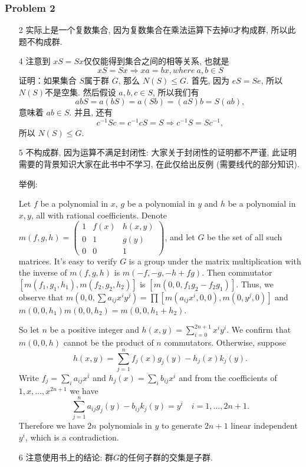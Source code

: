 \documentclass[a4paper,12pt]{ctexart}
\begin{document}
      

\subsubsection*{Problem 2}
      \begin{enumerate}
        \item[2] 实际上是一个复数集合, 因为复数集合在乘法运算下去掉$0$才构成群, 所以此题不构成群.
        \item[4] 注意到 $ xS=Sx $仅仅能得到集合之间的相等关系, 也就是
        \[xS=Sx\Rightarrow xa=bx,where~a,b\in S\] 
        证明：如果集合 $ S $属于群 $ G $, 那么 $ N(S)\leq G $.
        首先, 因为 $ eS=Se $, 所以$ N(S) $不是空集.
        然后假设 $ a,b,c\in S $, 所以我们有
        \[abS=a(bS)=a(Sb)=(aS)b=S(ab),\]
        意味着 $ ab\in S $.
        并且, 还有 \[ c^{-1}Sc=c^{-1}cS=S\Rightarrow c^{-1}S=Sc^{-1}, \]
        所以 $ N(S)\leq G $.
        \item[5] 不构成群, 因为运算不满足封闭性: 大家关于封闭性的证明都不严谨,
        此证明需要的背景知识大家在此书中不学习, 在此仅给出反例 (需要线代的部分知识). 
        
        举例:

        Let $ f $ be a polynomial in $ x $, $ g $ be a polynomial in $ y $ and $ h $ be a polynomial in $ x,y $, 
      all with rational coefficients. 
      Denote $ m(f,g,h)=\begin{pmatrix}
        1 &f(x) & h(x,y)\\
        0 &1    & g(y)\\
        0 &0    & 1
      \end{pmatrix} $, and let $ G $ be the set of all such matrices. It's easy to verify $ G $ is a group 
      under the matrix multiplication with the inverse of $ m(f,g,h) $ is $ m(-f,-g,-h+fg) $.
      Then commutator $ \left[m(f_1,g_1,h_1),m(f_2,g_2,h_2)\right] $ is $ \left[m(0,0,f_1g_2-f_2g_1)\right] $. 
      Thus, we observe that $ m(0,0,\sum a_{ij}x^iy^j)=\prod\left[m(a_{ij}x^i,0,0),m(0,y^j,0)\right] $ and 
      $ m(0,0,h_1)m(0,0,h_2)=m(0,0,h_1+h_2) $.

      So let $ n $ be a positive integer and $ h(x,y)=\sum_{i=0}^{2n+1}x^iy^i $.
      We confirm that $ m(0,0,h) $ cannot be the product of $ n $ commutators. Otherwise, suppose 
      \[h(x,y)=\sum_{j=1}^n f_j(x)g_j(y)-h_j(x)k_j(y).\]
      Write $ f_j=\sum_{i}a_{ij}x^i $ and $ h_j(x)=\sum_i b_{ij}x^i $ and from the coefficients of 
      $ 1,x,\dots,x^{2n+1} $ we have 
      \[\sum_{j=1}^na_{ij}g_j(y)-b_{ij}k_j(y)=y^i\quad i=1,\dots,2n+1.\]
      Therefore we have $ 2n $ polynomials in $ y $ to generate $ 2n+1 $ linear independent $ y^i $, 
      which is a contradiction. 
        \item[6] 注意使用书上的结论: 群$G$的任何子群的交集是子群.  
      \end{enumerate}
\end{document}
